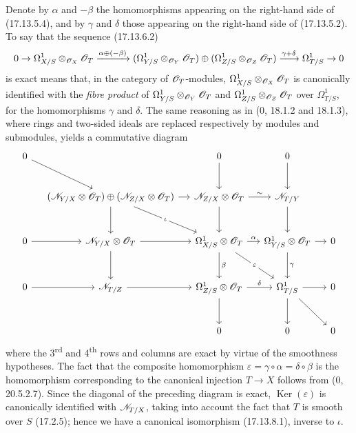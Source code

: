 
Denote by $\alpha$ and $-\beta$ the homomorphisms appearing on the right-hand side of (17.13.5.4), and by $\gamma$ and $\delta$ those appearing on the right-hand side of (17.13.5.2). To say that the sequence (17.13.6.2)
\[
0\to\Omega^1_{X/S}\otimes_{\mathscr{O}_X}\mathscr{O}_T
\xrightarrow{\alpha\oplus(-\beta)}
(\Omega^1_{Y/S}\otimes_{\mathscr{O}_Y}\mathscr{O}_T)\oplus
(\Omega^1_{Z/S}\otimes_{\mathscr{O}_Z}\mathscr{O}_T)
\xrightarrow{\gamma+\delta}\Omega^1_{T/S}\to0
\]
is exact means that, in the category of $\mathscr{O}_T$-modules, $\Omega^1_{X/S}\otimes_{\mathscr{O}_X}\mathscr{O}_T$ is canonically identified with the \emph{fibre product} of $\Omega^1_{Y/S}\otimes_{\mathscr{O}_Y}\mathscr{O}_T$ and $\Omega^1_{Z/S}\otimes_{\mathscr{O}_Z}\mathscr{O}_T$ over $\Omega^1_{T/S}$, for the homomorphisms $\gamma$ and $\delta$. The same reasoning as in (0, 18.1.2 and 18.1.3), where rings and two-sided ideals are replaced respectively by modules and submodules, yields a commutative diagram
{\scriptsize
\[
\begin{tikzcd}[column sep=small,row sep=large]
0 \ar[dr] & & 0 \ar[d] & 0 \ar[d] & \\
& (\sh{N}_{Y/X}\otimes\sh{O}_T)\oplus(\sh{N}_{Z/X}\otimes\sh{O}_T)
  \ar[r] \ar[d] \ar[dr,"\iota" description]
& \sh{N}_{Z/X}\otimes\sh{O}_T \ar[r,"\sim"] \ar[d]
& \sh{N}_{T/Y} \ar[d] & \\
0 \ar[r] & \sh{N}_{Y/X}\otimes\sh{O}_T \ar[r] \ar[d]
& \Omega^1_{X/S}\otimes\sh{O}_T \ar[r,"\alpha"] \ar[d,"\beta"] \ar[dr,"\varepsilon" description]
& \Omega^1_{Y/S}\otimes\sh{O}_T \ar[r] \ar[d,"\gamma"] & 0\\
0 \ar[r] & \sh{N}_{T/Z} \ar[r]
& \Omega^1_{Z/S}\otimes\sh{O}_T \ar[r,"\delta"] \ar[d]
& \Omega^1_{T/S} \ar[r] \ar[d] \ar[dr] & 0\\
& & 0 & 0 & 0
\end{tikzcd}
\]
}
where the 3\textsuperscript{rd} and 4\textsuperscript{th} rows and columns are exact by virtue of the smoothness hypotheses. The fact that the composite homomorphism $\varepsilon=\gamma\circ\alpha=\delta\circ\beta$ is the homomorphism corresponding to the canonical injection $T\to X$ follows from (0, 20.5.2.7). Since the diagonal of the preceding diagram is exact, $\operatorname{Ker}(\varepsilon)$ is canonically identified with $\mathscr{N}_{T/X}$, taking into account the fact that $T$ is smooth over $S$ (17.2.5); hence we have a canonical isomorphism (17.13.8.1), inverse to $\iota$.

